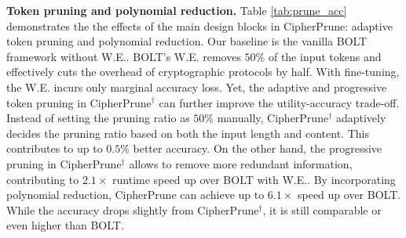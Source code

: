 \noindent\textbf{Token pruning and polynomial reduction.}
Table \ref{tab:prune_acc} demonstrates the the effects of the main design blocks in CipherPrune: adaptive token pruning and polynomial reduction. Our baseline is the vanilla BOLT framework without W.E.. BOLT's W.E. removes $50\%$ of the input tokens and effectively cuts the overhead of cryptographic protocols by half. With fine-tuning, the W.E. incurs only marginal accuracy loss. Yet, the adaptive and progressive token pruning in CipherPrune$^\dag$ can further improve the utility-accuracy trade-off. Instead of setting the pruning ratio as $50\%$ manually, CipherPrune$^\dag$ adaptively decides the pruning ratio based on both the input length and content. This contributes to up to $0.5\%$ better accuracy. On the other hand, the progressive pruning in CipherPrune$^\dag$ allows to remove more redundant information, contributing to $2.1\times$ runtime speed up over BOLT with W.E.. By incorporating polynomial reduction, CipherPrune can achieve up to $6.1\times$ speed up over BOLT. While the accuracy drops slightly from CipherPrune$^\dag$, it is still comparable or even higher than BOLT.


